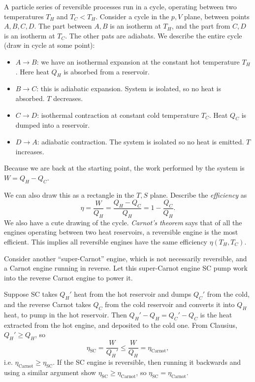 \documentclass[12pt]{article}
\begin{document}
A particle series of reversible processes run in a cycle, operating between two temperatures $T_H$ and $T_C < T_H$. Consider a cycle in the $p, V$ plane, between points $A, B, C, D$. The part between $A, B$ is an isotherm at $T_H$, and the part from $C, D$ is an isotherm at $T_C$. The other pats are adiabats. We describe the entire cycle (draw in cycle at some point):
\begin{itemize}
	\item $A\to B$: we have an isothermal expansion at the constant hot temperature $T_H$. Here heat $Q_H$ is absorbed from a reservoir.
	\item $B \to C$: this is adiabatic expansion. System is isolated, so no heat is absorbed. $T$ decreases.
	\item $C \to D$: isothermal contraction at constant cold temperature $T_C$. Heat $Q_C$ is dumped into a reservoir.
	\item $D\to A$: adiabatic contraction. The system is isolated so no heat is emitted. $T$ increases.
\end{itemize}
Because we are back at the starting point, the work performed by the system is $W = Q_H - Q_C$.

We can also draw this as a rectangle in the $T, S$ plane. Describe the \emph{efficiency} as
\[
\eta = \frac{W}{Q_H} = \frac{Q_H - Q_C}{Q_H} = 1 - \frac{Q_C}{Q_H}.
\]
We also have a cute drawing of the cycle. \emph{Carnot's theorem} says that of all the engines operating between two heat reservoirs, a reversible engine is the most efficient. This implies all reversible engines have the same efficiency $\eta(T_H, T_C)$.

\begin{proofbox}
	Consider another ``super-Carnot'' engine, which is not necessarily reversible, and a Carnot engine running in reverse. Let this super-Carnot engine SC pump work into the reverse Carnot engine to power it.

	Suppose SC takes $Q_H'$ heat from the hot reservoir and dumps $Q_C'$ from the cold, and the reverse Carnot takes $Q_C$ from the cold reservoir and converts it into $Q_H$ heat, to pump in the hot reservoir. Then $Q_H' - Q_H = Q_C' - Q_C$ is the heat extracted from the hot engine, and deposited to the cold one. From Clausius, $Q_H' \geq Q_H$, so
	\[
	\eta_{\mathrm{SC}} = \frac{W}{Q_H'} \leq \frac{W}{Q_H} = \eta_{\mathrm{Carnot}},
	\]
	i.e. $\eta_{\mathrm{Carnot}} \geq \eta_{\mathrm{SC}}$. If the SC engine is reversible, then running it backwards and using a similar argument show $\eta_{\mathrm{SC}} \geq \eta_{\mathrm{Carnot}}$, so $\eta_{\mathrm{SC}} = \eta_{\mathrm{Carnot}}$.
\end{proofbox}
\end{document}
